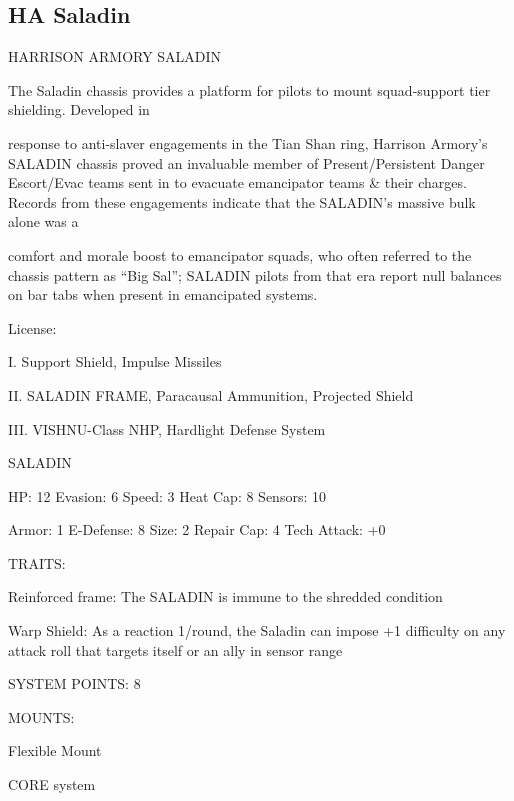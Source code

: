 \subsection{HA Saladin}

                                HARRISON ARMORY SALADIN

The Saladin chassis provides a platform for pilots to mount squad-support tier shielding. Developed in

response to anti-slaver engagements in the Tian Shan ring, Harrison Armory’s SALADIN chassis proved an
invaluable member of Present/Persistent Danger Escort/Evac teams sent in to evacuate emancipator teams
\& their charges. Records from these engagements indicate that the SALADIN’s massive bulk alone was a

comfort and morale boost to emancipator squads, who often referred to the chassis pattern as ``Big Sal'';
SALADIN pilots from that era report null balances on bar tabs when present in emancipated systems.

                                                   License:

I. Support Shield, Impulse Missiles

II. SALADIN FRAME, Paracausal Ammunition, Projected Shield

III. VISHNU-Class NHP, Hardlight Defense System


                                                 SALADIN

 HP: 12         Evasion: 6                            Speed: 3            Heat Cap: 8        Sensors: 10

 Armor: 1       E-Defense: 8                          Size: 2             Repair Cap: 4      Tech Attack:
                                                                                             +0

                                                   TRAITS:

 Reinforced frame: The SALADIN is immune to the shredded condition

 Warp Shield: As a reaction 1/round, the Saladin can impose +1 difficulty on any attack roll that targets
 itself or an ally in sensor range

                                             SYSTEM POINTS: 8

                                                  MOUNTS:

 Flexible Mount

                                                CORE system




